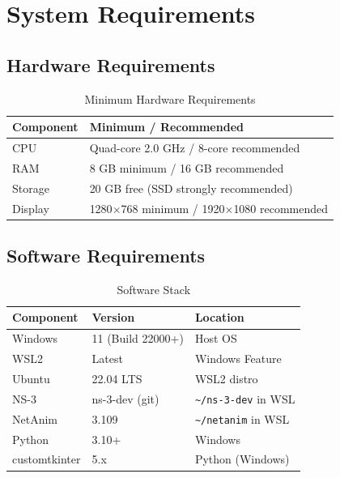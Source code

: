 \documentclass[12pt,a4paper]{article}
\newcommand{\cmd}[1]{\texttt{\color{codeblue}#1}}
\begin{document}
\section{System Requirements}

\subsection{Hardware Requirements}

\begin{table}[H]
\centering
\caption{Minimum Hardware Requirements}
\begin{tabular}{ll}
\toprule
\textbf{Component} & \textbf{Minimum / Recommended} \\
\midrule
CPU          & Quad-core 2.0 GHz / 8-core recommended \\
RAM          & 8 GB minimum / 16 GB recommended \\
Storage      & 20 GB free (SSD strongly recommended) \\
Display      & 1280$\times$768 minimum / 1920$\times$1080 recommended \\
\bottomrule
\end{tabular}
\end{table}

\subsection{Software Requirements}

\begin{table}[H]
\centering
\caption{Software Stack}
\begin{tabular}{lll}
\toprule
\textbf{Component}  & \textbf{Version}      & \textbf{Location} \\
\midrule
Windows             & 11 (Build 22000+)     & Host OS \\
WSL2                & Latest                & Windows Feature \\
Ubuntu              & 22.04 LTS             & WSL2 distro \\
NS-3                & ns-3-dev (git)        & \cmd{\textasciitilde/ns-3-dev} in WSL \\
NetAnim             & 3.109                 & \cmd{\textasciitilde/netanim} in WSL \\
Python              & 3.10+                 & Windows \\
customtkinter       & 5.x                   & Python (Windows) \\
\bottomrule
\end{tabular}
\end{table}
\end{document}
